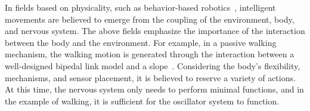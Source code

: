 In fields based on physicality, such as behavior-based robotics~\cite{Brooks1991intelligence}, intelligent movements are believed to emerge from the coupling of the environment, body, and nervous system. The above fields emphasize the importance of the interaction between the body and the environment. For example, in a passive walking mechanism, the walking motion is generated through the interaction between a well-designed bipedal link model and a slope~\cite{Garcia1996}. Considering the body's flexibility, mechanisms, and sensor placement, it is believed to reserve a variety of actions. At this time, the nervous system only needs to perform minimal functions, and in the example of walking, it is sufficient for the oscillator system to function.


